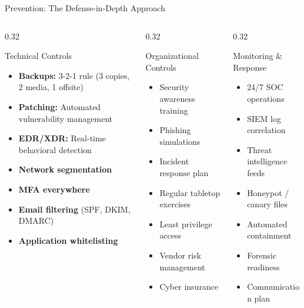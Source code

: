 \documentclass[aspectratio=169]{beamer}
\begin{document}
\begin{frame}{Prevention: The Defense-in-Depth Approach}
  \begin{columns}[T]
    \begin{column}{0.32\textwidth}
      \begin{block}{Technical Controls}
        \footnotesize
        \begin{itemize}
          \item \textbf{Backups:} 3-2-1 rule (3 copies, 2 media, 1 offsite)
          \item \textbf{Patching:} Automated vulnerability management
          \item \textbf{EDR/XDR:} Real-time behavioral detection
          \item \textbf{Network segmentation}
          \item \textbf{MFA everywhere}
          \item \textbf{Email filtering} (SPF, DKIM, DMARC)
          \item \textbf{Application whitelisting}
        \end{itemize}
      \end{block}
    \end{column}
    \begin{column}{0.32\textwidth}
      \begin{block}{Organizational Controls}
        \footnotesize
        \begin{itemize}
          \item Security awareness training
          \item Phishing simulations
          \item Incident response plan
          \item Regular tabletop exercises
          \item Least privilege access
          \item Vendor risk management
          \item Cyber insurance
        \end{itemize}
      \end{block}
    \end{column}
    \begin{column}{0.32\textwidth}
      \begin{block}{Monitoring \& Response}
        \footnotesize
        \begin{itemize}
          \item 24/7 SOC operations
          \item SIEM log correlation
          \item Threat intelligence feeds
          \item Honeypot / canary files
          \item Automated containment
          \item Forensic readiness
          \item Communication plan
        \end{itemize}
      \end{block}
    \end{column}
  \end{columns}


\end{frame}
\end{document}
